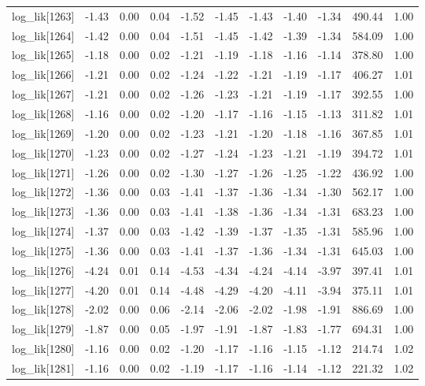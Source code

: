 \begin{table}[ht]
\begin{tabular}{rrrrrrrrrrr}
  log\_lik[1263] & -1.43 & 0.00 & 0.04 & -1.52 & -1.45 & -1.43 & -1.40 & -1.34 & 490.44 & 1.00 \\ 
  log\_lik[1264] & -1.42 & 0.00 & 0.04 & -1.51 & -1.45 & -1.42 & -1.39 & -1.34 & 584.09 & 1.00 \\ 
  log\_lik[1265] & -1.18 & 0.00 & 0.02 & -1.21 & -1.19 & -1.18 & -1.16 & -1.14 & 378.80 & 1.00 \\ 
  log\_lik[1266] & -1.21 & 0.00 & 0.02 & -1.24 & -1.22 & -1.21 & -1.19 & -1.17 & 406.27 & 1.01 \\ 
  log\_lik[1267] & -1.21 & 0.00 & 0.02 & -1.26 & -1.23 & -1.21 & -1.19 & -1.17 & 392.55 & 1.00 \\ 
  log\_lik[1268] & -1.16 & 0.00 & 0.02 & -1.20 & -1.17 & -1.16 & -1.15 & -1.13 & 311.82 & 1.01 \\ 
  log\_lik[1269] & -1.20 & 0.00 & 0.02 & -1.23 & -1.21 & -1.20 & -1.18 & -1.16 & 367.85 & 1.01 \\ 
  log\_lik[1270] & -1.23 & 0.00 & 0.02 & -1.27 & -1.24 & -1.23 & -1.21 & -1.19 & 394.72 & 1.01 \\ 
  log\_lik[1271] & -1.26 & 0.00 & 0.02 & -1.30 & -1.27 & -1.26 & -1.25 & -1.22 & 436.92 & 1.00 \\ 
  log\_lik[1272] & -1.36 & 0.00 & 0.03 & -1.41 & -1.37 & -1.36 & -1.34 & -1.30 & 562.17 & 1.00 \\ 
  log\_lik[1273] & -1.36 & 0.00 & 0.03 & -1.41 & -1.38 & -1.36 & -1.34 & -1.31 & 683.23 & 1.00 \\ 
  log\_lik[1274] & -1.37 & 0.00 & 0.03 & -1.42 & -1.39 & -1.37 & -1.35 & -1.31 & 585.96 & 1.00 \\ 
  log\_lik[1275] & -1.36 & 0.00 & 0.03 & -1.41 & -1.37 & -1.36 & -1.34 & -1.31 & 645.03 & 1.00 \\ 
  log\_lik[1276] & -4.24 & 0.01 & 0.14 & -4.53 & -4.34 & -4.24 & -4.14 & -3.97 & 397.41 & 1.01 \\ 
  log\_lik[1277] & -4.20 & 0.01 & 0.14 & -4.48 & -4.29 & -4.20 & -4.11 & -3.94 & 375.11 & 1.01 \\ 
  log\_lik[1278] & -2.02 & 0.00 & 0.06 & -2.14 & -2.06 & -2.02 & -1.98 & -1.91 & 886.69 & 1.00 \\ 
  log\_lik[1279] & -1.87 & 0.00 & 0.05 & -1.97 & -1.91 & -1.87 & -1.83 & -1.77 & 694.31 & 1.00 \\ 
  log\_lik[1280] & -1.16 & 0.00 & 0.02 & -1.20 & -1.17 & -1.16 & -1.15 & -1.12 & 214.74 & 1.02 \\ 
  log\_lik[1281] & -1.16 & 0.00 & 0.02 & -1.19 & -1.17 & -1.16 & -1.14 & -1.12 & 221.32 & 1.02 \\ 

\end{tabular}
\end{table}
